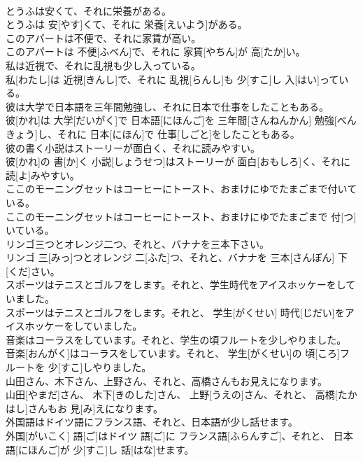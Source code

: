 \documentclass[8pt]{extreport}
\begin{document}
\begin{CJK}{UTF8}{min}
\\	とうふは安くて、それに栄養がある。	
\\	とうふは 安[やす]くて、それに 栄養[えいよう]がある。
\\	このアパートは不便で、それに家賃が高い。	
\\	このアパートは 不便[ふべん]で、それに 家賃[やちん]が 高[たか]い。
\\	私は近視で、それに乱視も少し入っている。	
\\	私[わたし]は 近視[きんし]で、それに 乱視[らんし]も 少[すこ]し 入[はい]っている。
\\	彼は大学で日本語を三年間勉強し、それに日本で仕事をしたこともある。	
\\	彼[かれ]は 大学[だいがく]で 日本語[にほんご]を 三年間[さんねんかん] 勉強[べんきょう]し、それに 日本[にほん]で 仕事[しごと]をしたこともある。
\\	彼の書く小説はストーリーが面白く、それに読みやすい。	
\\	彼[かれ]の 書[か]く 小説[しょうせつ]はストーリーが 面白[おもしろ]く、それに 読[よ]みやすい。
\\	ここのモーニングセットはコーヒーにトースト、おまけにゆでたまごまで付いている。	
\\	ここのモーニングセットはコーヒーにトースト、おまけにゆでたまごまで 付[つ]いている。
\\	リンゴ三つとオレンジ二つ、それと、バナナを三本下さい。	
\\	リンゴ 三[みっ]つとオレンジ 二[ふた]つ、それと、バナナを 三本[さんぽん] 下[くだ]さい。
\\	スポーツはテニスとゴルフをします。それと、学生時代をアイスホッケーをしていました。	
\\	スポーツはテニスとゴルフをします。それと、 学生[がくせい] 時代[じだい]をアイスホッケーをしていました。
\\	音楽はコーラスをしています。それと、学生の頃フルートを少しやりました。	
\\	音楽[おんがく]はコーラスをしています。それと、 学生[がくせい]の 頃[ころ]フルートを 少[すこ]しやりました。
\\	山田さん、木下さん、上野さん、それと、高橋さんもお見えになります。	
\\	山田[やまだ]さん、 木下[きのした]さん、 上野[うえの]さん、それと、 高橋[たかはし]さんもお 見[み]えになります。
\\	外国語はドイツ語にフランス語、それと、日本語が少し話せます。	
\\	外国[がいこく] 語[ご]はドイツ 語[ご]に フランス語[ふらんすご]、それと、 日本語[にほんご]が 少[すこ]し 話[はな]せます。

\end{CJK}
\end{document}
